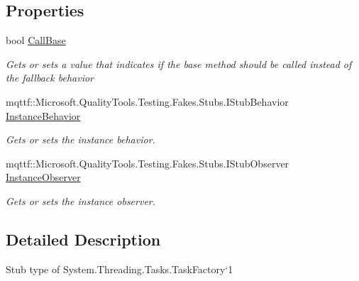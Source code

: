 \subsection*{Properties}
\begin{DoxyCompactItemize}
\item 
bool \hyperlink{class_system_1_1_threading_1_1_tasks_1_1_fakes_1_1_stub_task_factory_3_01_t_result_01_4_a5188e0c2282c6c9fc84367db08d5515c}{Call\-Base}
\begin{DoxyCompactList}\small\item\em Gets or sets a value that indicates if the base method should be called instead of the fallback behavior\end{DoxyCompactList}\item 
mqttf\-::\-Microsoft.\-Quality\-Tools.\-Testing.\-Fakes.\-Stubs.\-I\-Stub\-Behavior \hyperlink{class_system_1_1_threading_1_1_tasks_1_1_fakes_1_1_stub_task_factory_3_01_t_result_01_4_aa6b24f533333ccbc104264c0c5e5c1d5}{Instance\-Behavior}
\begin{DoxyCompactList}\small\item\em Gets or sets the instance behavior.\end{DoxyCompactList}\item 
mqttf\-::\-Microsoft.\-Quality\-Tools.\-Testing.\-Fakes.\-Stubs.\-I\-Stub\-Observer \hyperlink{class_system_1_1_threading_1_1_tasks_1_1_fakes_1_1_stub_task_factory_3_01_t_result_01_4_ace7ea01986013c65b500194b97bcdd1e}{Instance\-Observer}
\begin{DoxyCompactList}\small\item\em Gets or sets the instance observer.\end{DoxyCompactList}\end{DoxyCompactItemize}


\subsection{Detailed Description}
Stub type of System.\-Threading.\-Tasks.\-Task\-Factory`1



